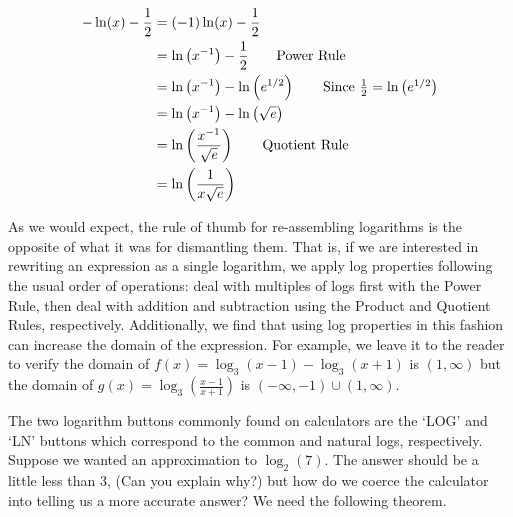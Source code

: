 {\begin{enumerate}
\begin{align*}
-\ln(x) - \frac{1}{2} & =  (-1)\ln(x) - \frac{1}{2}    \\ 
   & =  \ln\left(x^{-1}\right) - \frac{1}{2}  \tag*{Power Rule} \\
   & =  \ln\left(x^{-1}\right) - \ln\left(e^{1/2}\right) \tag*{Since $\frac{1}{2} = \ln\left(e^{1/2}\right)$} \\
   & =  \ln\left(x^{-1}\right) - \ln\left(\sqrt{e} \right) \\ 
   & =  \ln\left(\dfrac{x^{-1}}{\sqrt{e}}\right)  \tag*{Quotient Rule} \\ 
   & =  \ln\left(\dfrac{1}{x\sqrt{e}}\right) 
\end{align*}
\end{enumerate}
}

\medskip

As we would expect, the rule of thumb for re-assembling logarithms is the opposite of what it was for dismantling them.  That is, if we are interested in rewriting an expression as a single logarithm, we apply log properties following the usual order of operations:  deal with multiples of logs first with the Power Rule, then deal with addition and subtraction using the Product and Quotient Rules, respectively. Additionally, we find that using log properties in this fashion can increase the domain of the expression.  For example, we leave it to the reader to verify the domain of $f(x) = \log_{3}(x-1) - \log_{3}(x+1)$ is $(1,\infty)$ but the domain of $g(x) = \log_{3}\left(\frac{x-1}{x+1}\right)$ is $(-\infty, -1) \cup (1, \infty)$.  %

\smallskip

The two logarithm buttons commonly found on calculators are the `LOG' and `LN' buttons which correspond to the common and natural logs, respectively.  Suppose we wanted an approximation to $\log_{2}(7)$.  The answer should be a little less than $3$, (Can you explain why?) but how do we coerce the calculator into telling us a more accurate answer?  We need the following theorem.

\smallskip


